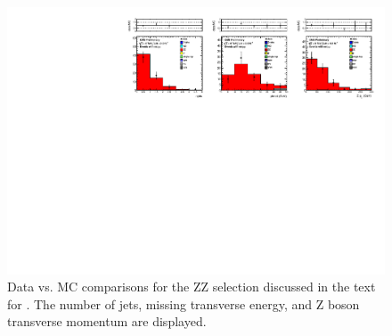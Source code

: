\begin{figure}[tbh]
\begin{center}
\includegraphics[width=1\linewidth]{plots/ZZ_eemm_92fb.pdf}
\caption{\label{fig:zz}\protect 
Data vs. MC comparisons for the ZZ selection discussed in the text for \lumi.
The number of jets, missing transverse energy, and Z boson transverse momentum are displayed.
}
\end{center}
\end{figure}






